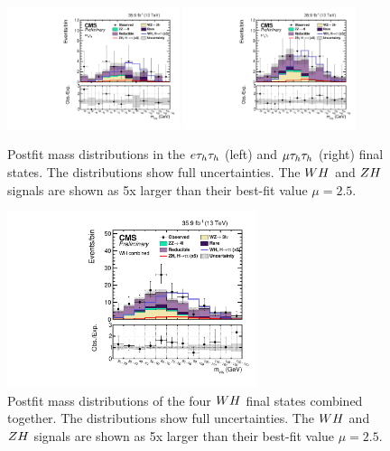 \begin{figure}[h!]
 \begin{center}
  \includegraphics[width=0.45\textwidth]{higgs_to_taus_vh/plots/wh/ett_postfit.pdf}
  \includegraphics[width=0.45\textwidth]{higgs_to_taus_vh/plots/wh/mtt_postfit.pdf}
 \end{center}
 \caption{Postfit mass distributions in the $e\tau_{h}\tau_{h}$ (left) 
 and $\mu\tau_{h}\tau_{h}$ (right) final states.
 The distributions show full uncertainties.
 The $WH$ and $ZH$ signals are shown as 5x larger than their best-fit
 value $\mu = 2.5$.
 }
 \label{fig:mass_ltt}
\end{figure}

\begin{figure}[h!]
 \begin{center}
  \includegraphics[width=0.65\textwidth]{higgs_to_taus_vh/plots/wh/wh_postfit.pdf}
 \end{center}
 \caption{Postfit mass distributions of the four $WH$ final states
 combined together. 
 The distributions show full uncertainties.
 The $WH$ and $ZH$ signals are shown as 5x larger than their best-fit
 value $\mu = 2.5$.
 }
 \label{fig:mass_wh}
\end{figure}


